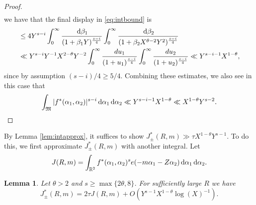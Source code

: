 \documentclass[11pt,reqno]{amsart}
\numberwithin{equation}{section}
\newtheorem{lemma}{Lemma}[section]
\renewcommand{\d}{\,{\rm d}}
\begin{document}
\begin{proof}
\begin{align}
\end{align} 
we have that the final display in \eqref{eq:intbound} is 
\begin{align*} & \leq 4Y^{s-i}\int_0^{\infty} \frac{\d\beta_1}{(1+\beta_1Y)^{\frac{s-i}{4}}} \int_0^{\infty} \frac{\d\beta_2}{(1+\beta_2X^{\theta-2}Y^2)^{\frac{s-i}{4}}} 
\\ & \ll Y^{s-i} Y^{-1}X^{2-\theta}Y^{-2}\int_0^{\infty} \frac{du_1}{(1+u_1)^{\frac{s-i}{4}}} \int_0^{\infty} \frac{du_2}{(1+u_2)^{\frac{s-i}{4}}} \ll Y^{s-i-1}X^{1-\theta}, 
\end{align*}
since by assumption $(s-i)/4 \geq 5/4$. Combining these estimates, we also see in this case that 
\[ \int_{\mathfrak{M}}|f^*(\alpha_1, \alpha_2)|^{s-i} \d\alpha_1\d\alpha_2 \ll Y^{s-i-1}X^{1-\theta} \ll X^{1-\theta}Y^{s-2}. \]
\end{proof}

By Lemma \ref{lem:intapprox}, it suffices to show $ J_{\pm}^*(R,m) \gg \tau X^{1-\theta}Y^{s-1}$. To do this, we first approximate $J_{\pm}^*(R,m)$ with another integral. Let 
\[ J(R,m) = \int_{\mathbb{R}^2} f^*(\alpha_1,\alpha_2)^se(-m\alpha_1-Z\alpha_2)\d\alpha_1\d\alpha_2. \]

\begin{lemma} \label{lem:sing} Let $\theta > 2$ and $s \geq \max\{2\theta,8\}$. For sufficiently large $R$ we have 
\[ J_{\pm}^*(R,m) = 2\tau J(R,m) + O(Y^{s-1}X^{1-\theta}\log(X)^{-1}).  \]
\end{lemma}
\end{document}
